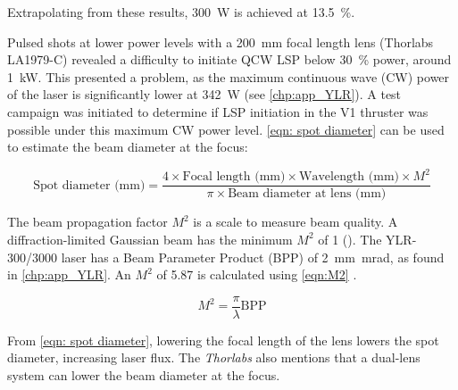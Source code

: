             Extrapolating from these results, \qty{300}{W} is achieved at \qty{13.5}{\%}.

            Pulsed shots at lower power levels with a \qty{200}{mm} focal length lens (Thorlabs LA1979-C) revealed a difficulty to initiate QCW LSP below \qty{30}{\%} power, around \qty{1}{kW}. This presented a problem, as the maximum continuous wave (CW) power of the laser is significantly lower at \qty{342}{W} (see \autoref{chp:app_YLR}). A test campaign was initiated to determine if LSP initiation in the V1 thruster was possible under this maximum CW power level. \autoref{eqn: spot diameter} \cite{LaserSpotSize} can be used to estimate the beam diameter at the focus:
            
            \begin{equation}\label{eqn: spot diameter}
                \text{Spot diameter (mm)} = \frac{4 \times \text{Focal length (mm)} \times \text{Wavelength (mm)}\times M^2}{\pi \times \text{Beam diameter at lens (mm)}}
            \end{equation}

            The beam propagation factor $M^2$ is a scale to measure beam quality. A diffraction-limited Gaussian beam has the minimum $M^2$ of 1 (\textcite{hechtUnderstandingLasersEntry2019}). The YLR-300/3000 laser has a Beam Parameter Product (BPP) of \qty{2}{mm.mrad}, as found in \autoref{chp:app_YLR}. An $M^2$ of 5.87 is calculated using \autoref{eqn:M2} \cite{paschottaBeamParameterProduct}.
            
            \begin{equation}\label{eqn:M2}
                M^2 = \frac{\pi}{\lambda} \text{BPP}
            \end{equation}
            
            From \autoref{eqn: spot diameter}, lowering the focal length of the lens lowers the spot diameter, increasing laser flux. The \textit{Thorlabs} \textcite{LensTutorial} also mentions that a dual-lens system can lower the beam diameter at the focus.

